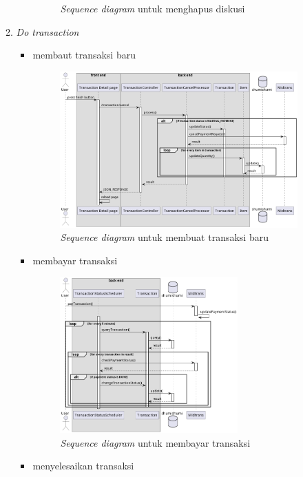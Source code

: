 \documentclass[a4paper]{article}
\begin{document}
\begin{enumerate}
\begin{enumerate}
\begin{itemize}
\begin{figure}[h]
                \caption{\textit{Sequence diagram} untuk menghapus diskusi}
            \end{figure}
        \end{itemize}
        \newpage

        \item \textit{Do transaction}
        \begin{itemize}
            \item membaut transaksi baru
            \begin{figure}[h]
                \centering
                \includegraphics*[height=6cm]{./diagram/sequence diagram/15. transaction/cancel transaction/cancel transaction.png}
                \caption{\textit{Sequence diagram} untuk membuat transaksi baru}
            \end{figure}
            \item membayar transaksi
            \begin{figure}[h]
                \centering
                \includegraphics*[height=6cm]{./diagram/sequence diagram/15. transaction/pay transaction/pay trx.png}
                \caption{\textit{Sequence diagram} untuk membayar transaksi}
            \end{figure}
            \newpage
            \item menyelesaikan transaksi
            \begin{figure}[h]

\end{figure}
\end{itemize}
\end{enumerate}
\end{enumerate}
\end{document}
